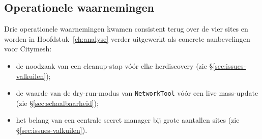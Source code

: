 \subsection{Operationele waarnemingen}
\label{sec:analyse-operationeel}

Drie operationele waarnemingen kwamen consistent terug over de vier sites en worden in Hoofdstuk~\ref{ch:analyse} verder uitgewerkt als concrete aanbevelingen voor Citymesh:
\begin{itemize}
  \item de noodzaak van een cleanup-stap vóór elke herdiscovery (zie \S\ref{sec:issues-valkuilen});
  \item de waarde van de dry-run-modus van \texttt{NetworkTool} vóór een live mass-update (zie \S\ref{sec:schaalbaarheid});
  \item het belang van een centrale secret manager bij grote aantallen sites (zie \S\ref{sec:issues-valkuilen}).
\end{itemize}
